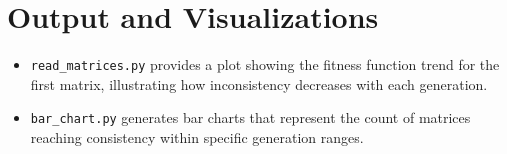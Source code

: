 \documentclass{article}
\begin{document}
\section{Output and Visualizations}
\begin{itemize}
    \item \texttt{read\_matrices.py} provides a plot showing the fitness function trend for the first matrix, illustrating how inconsistency decreases with each generation.
    \item \texttt{bar\_chart.py} generates bar charts that represent the count of matrices reaching consistency within specific generation ranges.
\end{itemize}
\end{document}
